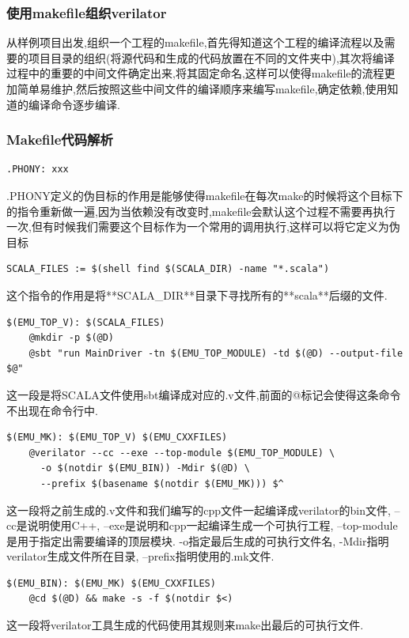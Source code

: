 \documentclass[lang=cn,11pt,a4paper]{elegantpaper}
\begin{document}
\subsubsection{使用makefile组织verilator}
从样例项目出发,组织一个工程的makefile,首先得知道这个工程的编译流程以及需要的项目目录的组织(将源代码和生成的代码放置在不同的文件夹中),其次将编译过程中的重要的中间文件确定出来,将其固定命名,这样可以使得makefile的流程更加简单易维护,然后按照这些中间文件的编译顺序来编写makefile,确定依赖,使用知道的编译命令逐步编译.

\subsubsection{Makefile代码解析}
\begin{lstlisting}
.PHONY: xxx
\end{lstlisting}
.PHONY定义的伪目标的作用是能够使得makefile在每次make的时候将这个目标下的指令重新做一遍,因为当依赖没有改变时,makefile会默认这个过程不需要再执行一次,但有时候我们需要这个目标作为一个常用的调用执行,这样可以将它定义为伪目标

\begin{lstlisting}
SCALA_FILES := $(shell find $(SCALA_DIR) -name "*.scala")
\end{lstlisting}
这个指令的作用是将**SCALA\_DIR**目录下寻找所有的**scala**后缀的文件.
\begin{lstlisting}
$(EMU_TOP_V): $(SCALA_FILES)
	@mkdir -p $(@D)
	@sbt "run MainDriver -tn $(EMU_TOP_MODULE) -td $(@D) --output-file $@"
\end{lstlisting}
这一段是将SCALA文件使用sbt编译成对应的.v文件,前面的@标记会使得这条命令不出现在命令行中.
\begin{lstlisting}
$(EMU_MK): $(EMU_TOP_V) $(EMU_CXXFILES)
	@verilator --cc --exe --top-module $(EMU_TOP_MODULE) \
	  -o $(notdir $(EMU_BIN)) -Mdir $(@D) \
	  --prefix $(basename $(notdir $(EMU_MK))) $^ 
\end{lstlisting}
这一段将之前生成的.v文件和我们编写的cpp文件一起编译成verilator的bin文件, --cc是说明使用C++, --exe是说明和cpp一起编译生成一个可执行工程, --top-module是用于指定出需要编译的顶层模块. -o指定最后生成的可执行文件名, -Mdir指明verilator生成文件所在目录, --prefix指明使用的.mk文件.

\begin{lstlisting}
$(EMU_BIN): $(EMU_MK) $(EMU_CXXFILES)
	@cd $(@D) && make -s -f $(notdir $<)
\end{lstlisting}
这一段将verilator工具生成的代码使用其规则来make出最后的可执行文件.
\end{document}
